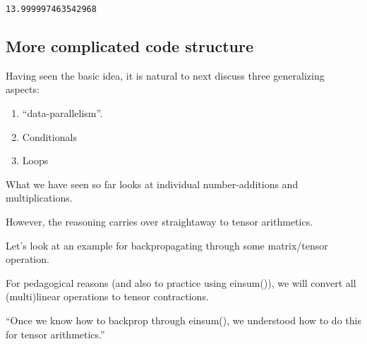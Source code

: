 \documentclass[11pt]{article}
\providecommand{\tightlist}{%
      \setlength{\itemsep}{0pt}\setlength{\parskip}{0pt}}
\begin{document}
    \begin{Verbatim}[commandchars=\\\{\}]
13.999997463542968
    \end{Verbatim}

    \hypertarget{more-complicated-code-structure}{%
\subsection{More complicated code
structure}\label{more-complicated-code-structure}}

Having seen the basic idea, it is natural to next discuss three
generalizing aspects:

\begin{enumerate}
\def\labelenumi{\arabic{enumi}.}
\tightlist
\item
  ``data-parallelism''.
\item
  Conditionals
\item
  Loops
\end{enumerate}

What we have seen so far looks at individual number-additions and
multiplications.

However, the reasoning carries over straightaway to tensor arithmetics.

Let's look at an example for backpropagating through some matrix/tensor
operation.

For pedagogical reasons (and also to practice using einsum()), we will
convert all (multi)linear operations to tensor contractions.

``Once we know how to backprop through einsum(), we understood how to do
this for tensor arithmetics.''
\end{document}
